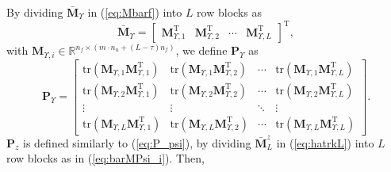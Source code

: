 \documentclass[twocolumn]{autart}
\begin{document}
By dividing $\mathbf{\bar M}_{\Upsilon}$ in (\ref{eq:Mbarf}) into $L$ row blocks as
\begin{equation}\label{eq:barMPsi_i}
\mathbf{\bar M}_{\Upsilon} = \left[ \begin{array}{cccc}
                                    \mathbf{M}_{\Upsilon,1}^\mathrm{T} & \mathbf{M}_{\Upsilon,2}^\mathrm{T} & \cdots & \mathbf{M}_{\Upsilon,L}^\mathrm{T}
                                   \end{array}
 \right]^\mathrm{T},
\end{equation}
with $\mathbf{M}_{\Upsilon,i} \in \mathbb{R}^{n_f \times \left( m\cdot n_u + \left( L-\tau \right)n_f \right)}$, we define $\mathbf{P}_{\Upsilon}$ as
\begin{equation}\label{eq:P_psi}
\mathbf{P}_{\Upsilon} = \left[ \begin{smallmatrix}
                             \mathrm{tr}\left( \mathbf{M}_{\Upsilon,1} \mathbf{M}_{\Upsilon,1}^\mathrm{T} \right) &
                             \mathrm{tr}\left( \mathbf{M}_{\Upsilon,1} \mathbf{M}_{\Upsilon,2}^\mathrm{T} \right)& \cdots & \mathrm{tr}\left( \mathbf{M}_{\Upsilon,1} \mathbf{M}_{\Upsilon,L}^\mathrm{T} \right) \\
                             \mathrm{tr}\left( \mathbf{M}_{\Upsilon,2} \mathbf{M}_{\Upsilon,1}^\mathrm{T} \right) &
                             \mathrm{tr}\left( \mathbf{M}_{\Upsilon,2} \mathbf{M}_{\Upsilon,2}^\mathrm{T} \right) & \cdots &
                             \mathrm{tr}\left( \mathbf{M}_{\Upsilon,2} \mathbf{M}_{\Upsilon,L}^\mathrm{T} \right) \\
                             \vdots & \vdots & \ddots & \vdots \\
                             \mathrm{tr}\left( \mathbf{M}_{\Upsilon,L} \mathbf{M}_{\Upsilon,1}^\mathrm{T} \right) &
                             \mathrm{tr}\left( \mathbf{M}_{\Upsilon,L} \mathbf{M}_{\Upsilon,2}^\mathrm{T} \right) &
                             \cdots & \mathrm{tr}\left( \mathbf{M}_{\Upsilon,L} \mathbf{M}_{\Upsilon,L}^\mathrm{T} \right)
                           \end{smallmatrix}
 \right].
\end{equation}
$\mathbf{P}_z$ is defined similarly to (\ref{eq:P_psi}), by dividing $\mathbf{\bar M}_L^z$ in (\ref{eq:hatrkL}) into $L$ row blocks as in (\ref{eq:barMPsi_i}). Then,
\end{document}
